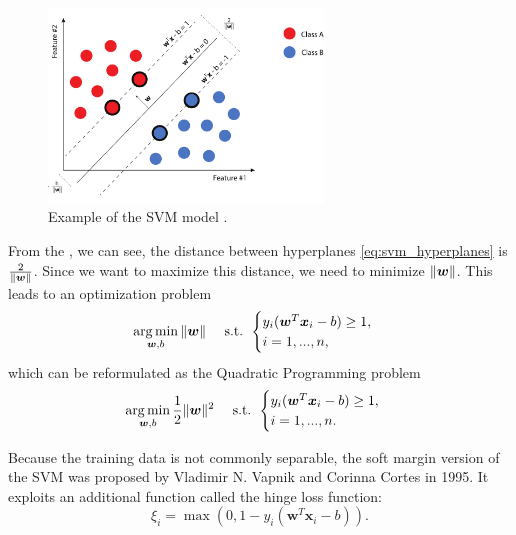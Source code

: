 \begin{figure}[ht!]
    \centering
    \includegraphics[width=0.65\textwidth]{Figures/svm/hyperplane_svm.pdf}
    \caption[Example of the SVM model]{Example of the SVM model \cite{Kruzik2018}.}
    \label{fig:svm-margin}
\end{figure}

From the , we can see, the distance between hyperplanes \eqref{eq:svm_hyperplanes} is \( \frac{2}{\left\lVert\boldsymbol{w}\right\rVert} \). Since we want to maximize this distance, we need to minimize $\left\lVert\boldsymbol{w}\right\rVert$. This leads to an optimization problem
\begin{equation}
    \operatorname*{arg\,min}_{\boldsymbol{w},b} \|\boldsymbol{w}\|\quad \text{ s.t. }
    \begin{cases}
        y_i(\boldsymbol{w}^T\boldsymbol{x}_i-b)\geq1,\\
        i=1, ...,n,
    \end{cases}
\end{equation}
which can be reformulated as the Quadratic Programming problem
\begin{equation}
    \operatorname*{arg\,min}_{\boldsymbol{w},b} \frac{1}{2}\|\boldsymbol{w}\|^2\quad \text{ s.t. }
    \begin{cases}
        y_i(\boldsymbol{w}^T\boldsymbol{x}_i-b)\geq1,\\
        i=1, ...,n.
    \end{cases}
    \label{eq:svm_hard_margin_minimization}
\end{equation}

Because the training data is not commonly separable, the soft margin version of the SVM was proposed by Vladimir N. Vapnik and Corinna Cortes \cite{Cortes1995} in 1995. It exploits an additional function called the hinge loss function:
\begin{equation}
    \xi_i = \max(0, 1-y_i(\boldsymbol{w}^T\boldsymbol{x}_i-b)).
    \label{eq:svm_hinge_loss}
\end{equation}

